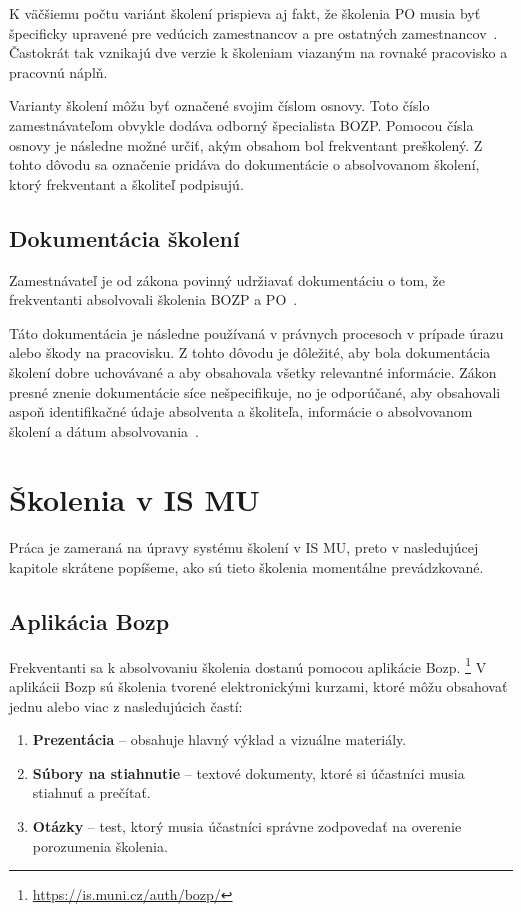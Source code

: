 \documentclass[
  digital,     %
  oneside,     %
  nosansbold,  %
  nocolorbold, %
  lof,         %
  nolot,         %
]{fithesis4}
\begin{document}
K väčšiemu počtu variánt školení prispieva aj fakt, že školenia PO musia byť špecificky upravené pre vedúcich zamestnancov a pre ostatných zamestnancov~\cite[~§16~odst.~2]{cesko_zakon_pozarni_ochrana}. Častokrát tak vznikajú dve verzie k školeniam viazaným na rovnaké pracovisko a pracovnú náplň.

Varianty školení môžu byť označené svojim číslom osnovy. Toto číslo zamestnávateľom obvykle dodáva odborný špecialista BOZP. Pomocou čísla osnovy je následne možné určiť, akým obsahom bol frekventant preškolený. Z tohto dôvodu sa označenie pridáva do dokumentácie o absolvovanom školení, ktorý frekventant a školiteľ podpisujú.

\section{Dokumentácia školení}
Zamestnávateľ je od zákona povinný udržiavať dokumentáciu o tom, že frekventanti absolvovali školenia BOZP a PO~\cites[§~103~odst.~3]{cesko_zakonik_prace}[§~27]{cesko_vyhlaska_poziarna_prevence}.

Táto dokumentácia je následne používaná v právnych procesoch v prípade úrazu alebo škody na pracovisku. Z tohto dôvodu je dôležité, aby bola dokumentácia školení dobre uchovávané a aby obsahovala všetky relevantné informácie. Zákon presné znenie dokumentácie síce nešpecifikuje, no je odporúčané, aby obsahovali aspoň identifikačné údaje absolventa a školiteľa, informácie o absolvovanom školení a dátum absolvovania~\cite{prevent_bozp}.

\chapter{Školenia v IS MU}
\label{kap-2}
Práca je zameraná na úpravy systému školení v IS MU, preto v nasledujúcej kapitole skrátene popíšeme, ako sú tieto školenia momentálne prevádzkované. 

\section{Aplikácia Bozp}
Frekventanti sa k absolvovaniu školenia dostanú pomocou aplikácie Bozp.
\footnote{\url{https://is.muni.cz/auth/bozp/}} V aplikácii Bozp sú školenia tvorené elektronickými kurzami, ktoré môžu obsahovať jednu alebo viac z nasledujúcich častí:
\begin{enumerate}
    \item \textbf{Prezentácia} – obsahuje hlavný výklad a vizuálne materiály.
    \item \textbf{Súbory na stiahnutie} – textové dokumenty, ktoré si účastníci musia stiahnuť a prečítať.
    \item \textbf{Otázky} – test, ktorý musia účastníci správne zodpovedať na overenie porozumenia školenia.~\cite[19]{kandova2019}
\end{enumerate}
\end{document}

